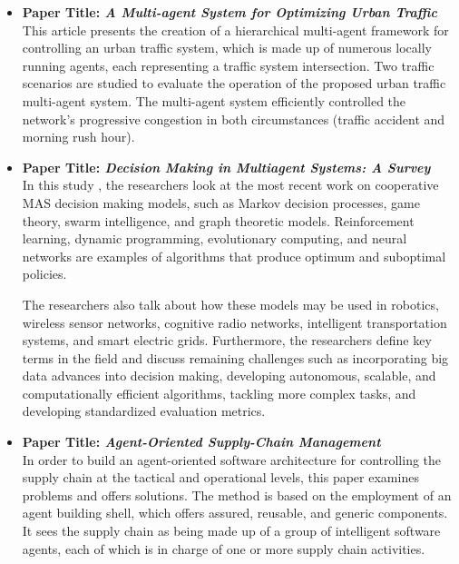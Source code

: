 \begin{itemize}[label={}]
\vspace{.5cm}

\item \textbf{Paper Title: \textit{A Multi-agent System for Optimizing Urban Traffic}}\\

This article \cite{traffmulti} presents the creation of a hierarchical multi-agent framework for controlling an urban traffic system, which is made up of numerous locally running agents, each representing a traffic system intersection. Two traffic scenarios are studied to evaluate the operation of the proposed urban traffic multi-agent system. The multi-agent system efficiently controlled the network's progressive congestion in both circumstances (traffic accident and morning rush hour).

\vspace{.5cm}

\item \textbf{Paper Title: \textit{Decision Making in Multiagent Systems: A Survey}} \\

In this study \cite{decision}, the researchers look at the most recent work on cooperative MAS decision making models, such as Markov decision processes, game theory, swarm intelligence, and graph theoretic models. Reinforcement learning, dynamic programming, evolutionary computing, and neural networks are examples of algorithms that produce optimum and suboptimal policies.

\vspace{.5cm}

The researchers also talk about how these models may be used in robotics, wireless sensor networks, cognitive radio networks, intelligent transportation systems, and smart electric grids. Furthermore, the researchers define key terms in the field and discuss remaining challenges such as incorporating big data advances into decision making, developing autonomous, scalable, and computationally efficient algorithms, tackling more complex tasks, and developing standardized evaluation metrics.

\vspace{.5cm}

\item \textbf{Paper Title: \textit{Agent-Oriented Supply-Chain Management}} \\

In order to build an agent-oriented software architecture for controlling the supply chain at the tactical and operational levels, this paper \cite{agSupch} examines problems and offers solutions. The method is based on the employment of an agent building shell, which offers assured, reusable, and generic components. It sees the supply chain as being made up of a group of intelligent software agents, each of which is in charge of one or more supply chain activities. 


\end{itemize}

